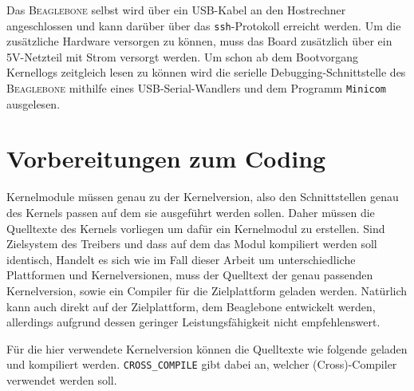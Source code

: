 Das \textsc{Beaglebone} selbst wird über ein USB-Kabel an den Hostrechner angeschlossen und kann darüber über das \texttt{ssh}-Protokoll erreicht werden. Um die zusätzliche Hardware versorgen zu können, muss das Board zusätzlich über ein 5V-Netzteil mit Strom versorgt werden. Um schon ab dem Bootvorgang Kernellogs zeitgleich lesen zu können wird die serielle Debugging-Schnittstelle des \textsc{Beaglebone} mithilfe eines USB-Serial-Wandlers und dem Programm \texttt{Minicom} ausgelesen. 


\section{Vorbereitungen zum Coding} %
Kernelmodule müssen genau zu der Kernelversion, also den Schnittstellen genau des Kernels passen auf dem sie ausgeführt werden sollen. Daher müssen die Quelltexte des Kernels vorliegen um dafür ein Kernelmodul zu erstellen. Sind Zielsystem des Treibers und dass auf dem das Modul kompiliert werden soll identisch, %
Handelt es sich wie im Fall dieser Arbeit um unterschiedliche Plattformen und Kernelversionen, muss der Quelltext der genau passenden Kernelversion, sowie ein Compiler für die Zielplattform geladen werden. Natürlich kann auch direkt auf der Zielplattform, dem Beaglebone entwickelt werden, allerdings aufgrund dessen geringer Leistungsfähigkeit nicht empfehlenswert.

Für die hier verwendete Kernelversion können die Quelltexte wie folgende geladen und kompiliert werden. \texttt{CROSS\_COMPILE} gibt dabei an, welcher (Cross)-Compiler verwendet werden soll.


